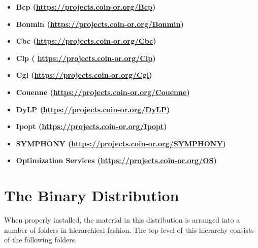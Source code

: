 \documentclass[11pt]{article}
\renewcommand{\_}{{\char"5F}}
\renewcommand{\{}{{\char"7B}}
\renewcommand{\}}{{\char"7D}}
\renewcommand{\^}{{\char"0D}}
\renewcommand{\'}{{\char"0D}}
\begin{document}
\begin{itemize}
\item[] {\bf Bcp (\url{https://projects.coin-or.org/Bcp}) }
\item[] {\bf Bonmin  (\url{https://projects.coin-or.org/Bonmin})}
\item[] {\bf Cbc (\url{https://projects.coin-or.org/Cbc})}
\item[] {\bf Clp ( \url{https://projects.coin-or.org/Clp})}
\item[] {\bf Cgl  (\url{https://projects.coin-or.org/Cgl})}
\item[] {\bf Couenne (\url{https://projects.coin-or.org/Couenne})}
\item[] {\bf DyLP (\url{https://projects.coin-or.org/DyLP})}
\item[] {\bf Ipopt  (\url{https://projects.coin-or.org/Ipopt})}
\item[] {\bf SYMPHONY (\url{https://projects.coin-or.org/SYMPHONY})}
\item[] {\bf Optimization Services (\url{https://projects.coin-or.org/OS}) }
\end{itemize}


\section{The Binary Distribution}\label{section:distribution}

When properly installed, the material in this distribution is arranged into a number of folders
in hierarchical fashion. The top level of this hierarchy consists of the following folders.
\end{document}
